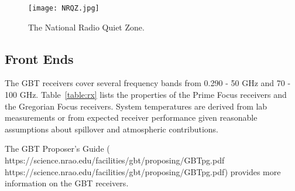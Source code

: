 \begin{figure}[!h]
\begin{center}
\texttt{[image: NRQZ.jpg]}
\caption[National Radio Quiet Zone]
{The National Radio Quiet Zone.
\label{fig:nrqz}}
\end{center}
\end{figure}

\newpage


\subsection{Front Ends}

The \gls{GBT} receivers cover several frequency bands from
0.290 - 50 GHz and 70 - 100 GHz. Table~\ref{table:rx} lists the properties
of the Prime Focus receivers and the Gregorian Focus receivers. System temperatures
are derived from lab measurements or from expected receiver performance given
reasonable assumptions about spillover and atmospheric contributions.

The \gls{GBT} Proposer's Guide (\htmladdnormallink
{https://science.nrao.edu/facilities/gbt/proposing/GBTpg.pdf}
{https://science.nrao.edu/facilities/gbt/proposing/GBTpg.pdf}) 
provides more information on the \gls{GBT} receivers.


